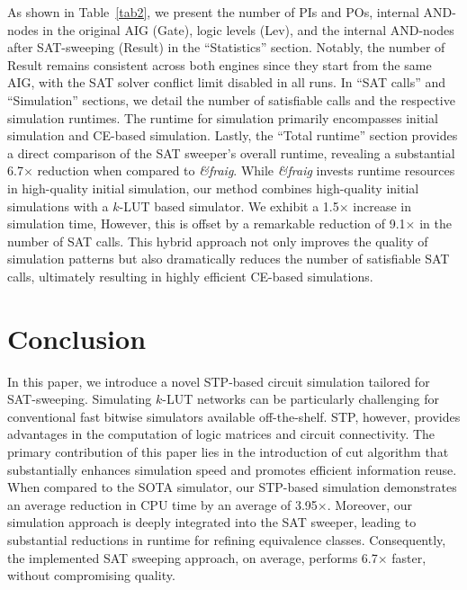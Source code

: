 \documentclass[conference]{IEEEtran}
\begin{document}
As shown in Table~\ref{tab2}, we present the number of PIs and POs, internal AND-nodes in the original AIG (Gate), logic levels (Lev), and the internal AND-nodes after SAT-sweeping (Result) in the ``Statistics'' section.
Notably, the number of Result remains consistent across both engines since they start from the same AIG, with the SAT solver conflict limit disabled in all runs.
In ``SAT calls'' and ``Simulation'' sections, we detail the number of satisfiable calls and the respective simulation runtimes. 
The runtime for simulation primarily encompasses initial simulation and CE-based simulation.
Lastly, the ``Total runtime'' section provides a direct comparison of the SAT sweeper's overall runtime, revealing a substantial 6.7$\times$ reduction when compared to \emph{\&fraig}. 
While \emph{\&fraig} invests runtime resources in high-quality initial simulation, our method combines high-quality initial simulations with a $k$-LUT based simulator. 
We exhibit a 1.5$\times$ increase in simulation time, However, this is offset by a remarkable reduction of 9.1$\times$ in the number of SAT calls.
This hybrid approach not only improves the quality of simulation patterns but also dramatically reduces the number of satisfiable SAT calls, ultimately resulting in highly efficient CE-based simulations.

\vspace{-2mm}
\section{Conclusion}
\label{sec7}
In this paper, we introduce a novel STP-based circuit simulation tailored for SAT-sweeping. 
Simulating $k$-LUT networks can be particularly challenging for conventional fast bitwise simulators available off-the-shelf. 
STP, however, provides advantages in the computation of logic matrices and circuit connectivity.
The primary contribution of this paper lies in the introduction of cut algorithm that substantially enhances simulation speed and promotes efficient information reuse. 
When compared to the SOTA simulator, our STP-based simulation demonstrates an average reduction in CPU time by an average of 3.95$\times$.
Moreover, our simulation approach is deeply integrated into the SAT sweeper, leading to substantial reductions in runtime for refining equivalence classes. 
Consequently, the implemented SAT sweeping approach, on average, performs 6.7$\times$ faster, without compromising quality.
\end{document}
